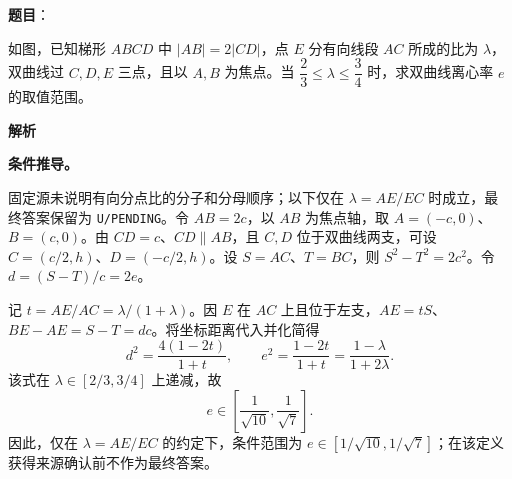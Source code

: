 \begin{answer}

\textbf{题目}：

如图，已知梯形 $ABCD$ 中 $|AB|=2|CD|$，点 $E$ 分有向线段 $AC$ 所成的比为 $\lambda$，双曲线过 $C,D,E$ 三点，且以 $A,B$ 为焦点。当 $\dfrac{2}{3}\leq\lambda\leq\dfrac{3}{4}$ 时，求双曲线离心率 $e$ 的取值范围。
\nopagebreak[4]
\begin{center}\end{center}
\nopagebreak[4]
\textbf{解析}

\textbf{条件推导。}

固定源未说明有向分点比的分子和分母顺序；以下仅在 $\lambda=AE/EC$ 时成立，最终答案保留为 \texttt{U/PENDING}。令 $AB=2c$，以 $AB$ 为焦点轴，取 $A=(-c,0)$、$B=(c,0)$。由 $CD=c$、$CD\parallel AB$，且 $C,D$ 位于双曲线两支，可设 $C=(c/2,h)$、$D=(-c/2,h)$。设 $S=AC$、$T=BC$，则 $S^2-T^2=2c^2$。令 $d=(S-T)/c=2e$。

记 $t=AE/AC=\lambda/(1+\lambda)$。因 $E$ 在 $AC$ 上且位于左支，$AE=tS$、$BE-AE=S-T=dc$。将坐标距离代入并化简得
\nopagebreak[4]
\[
d^2=\frac{4(1-2t)}{1+t},\qquad e^2=\frac{1-2t}{1+t}=\frac{1-\lambda}{1+2\lambda}.
\]
该式在 $\lambda\in[2/3,3/4]$ 上递减，故
\nopagebreak[4]
\[
e\in\left[\frac1{\sqrt{10}},\frac1{\sqrt7}\right].
\]
因此，仅在 $\lambda=AE/EC$ 的约定下，条件范围为 $e\in[1/\sqrt{10},1/\sqrt7]$；在该定义获得来源确认前不作为最终答案。


\end{answer}